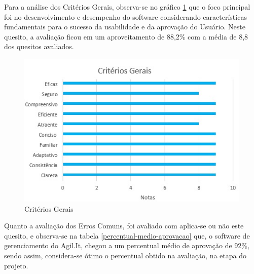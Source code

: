 Para a análise dos Critérios Gerais, observa-se no gráfico \ref{criterios-gerais} que o foco principal foi no desenvolvimento e desempenho do software considerando características fundamentais para o sucesso da usabilidade e da aprovação do Usuário. Neste quesito, a avaliação ficou em um aproveitamento de 88,2\% com a média de 8,8 dos quesitos avaliados.

\begin{figure}[H]
	\caption{\label{criterios-gerais}Critérios Gerais}
	\begin{center}
		\includegraphics[scale=0.86]{./Figuras/cap-testes/criterios-gerais.jpeg}
	\end{center}
\end{figure}

Quanto a avaliação dos Erros Comuns, foi avaliado com aplica-se ou não este quesito, e observa-se na tabela \ref{percentual-medio-aprovacao} que, o software de gerenciamento do Agil.It, chegou a um percentual médio de aprovação de 92\%, sendo assim, considera-se ótimo o percentual obtido na avaliação, na etapa do projeto.

